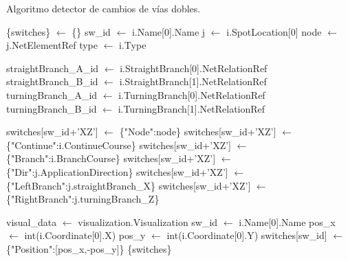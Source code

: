     \begin{algorithm}[H]
	\caption{Algoritmo detector de cambios de vías dobles.}
	\label{alg:switches_2}
		\begin{algorithmic}
			\STATE \{switches\} $\gets$ \{\}
						\STATE sw\_id $\gets$ i.Name[0].Name
						\STATE j $\gets$ i.SpotLocation[0]
						\STATE node $\gets$ j.NetElementRef
						\STATE type $\gets$ i.Type
						
							\STATE straightBranch\_A\_id $\gets$ i.StraightBranch[0].NetRelationRef
							\STATE straightBranch\_B\_id $\gets$ i.StraightBranch[1].NetRelationRef
							\STATE turningBranch\_A\_id $\gets$ i.TurningBranch[0].NetRelationRef
							\STATE turningBranch\_B\_id $\gets$ i.TurningBranch[1].NetRelationRef
							
								\STATE switches[sw\_id+'XZ'] $\gets$ \{"Node":node\}
								\STATE switches[sw\_id+'XZ'] $\gets$ \{"Continue":i.ContinueCourse\}
								\STATE switches[sw\_id+'XZ'] $\gets$ \{"Branch":i.BranchCourse\}
								\STATE switches[sw\_id+'XZ'] $\gets$ \{"Dir":j.ApplicationDirection\}
								\STATE switches[sw\_id+'XZ'] $\gets$ \{"LeftBranch":j.straightBranch\_X\}
								\STATE switches[sw\_id+'XZ'] $\gets$ \{"RightBranch":j.turningBranch\_Z\}
							\ENDFOR
						\ENDIF
					
					\ENDIF
				\ENDFOR
			\ENDIF
			\STATE visual\_data $\gets$ visualization.Visualization
					\STATE sw\_id $\gets$ i.Name[0].Name
						\STATE pos\_x $\gets$ int(i.Coordinate[0].X)
						\STATE pos\_y $\gets$ int(i.Coordinate[0].Y)
						\STATE switches[sw\_id] $\gets$ \{"Position":[pos\_x,-pos\_y]\}
					\ENDIF 
				\ENDFOR
			\ENDIF
			\OUTPUT \{switches\}
		\end{algorithmic}
	\end{algorithm}
	
